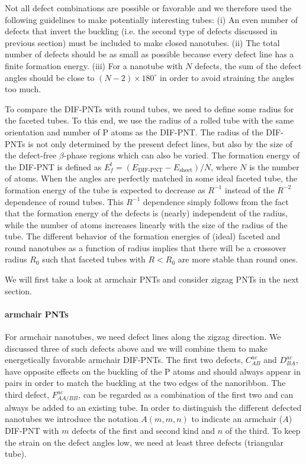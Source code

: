 Not all defect combinations are possible or favorable and we therefore used the following guidelines to make potentially interesting tubes: 
(i) An even number of defects that invert the buckling (i.e. the second type of defects discussed in previous section) must be included to make closed nanotubes. (ii) The total number of defects should  be as small as possible because every defect line has a finite formation energy. (iii) For a nanotube with $N$ defects, the sum of the defect angles should be close to $(N-2)\times 180^{\circ}$ in order to avoid straining the angles too much. 

To compare the DIF-PNTs with round tubes, we need to define some radius for the faceted tubes. To this end, we use the radius of a rolled tube with the same orientation and number of P atoms as the DIF-PNT. The radius of the DIF-PNTs is not only determined by the present defect lines, but also by the size of the defect-free $\beta$-phase regions which can also be varied. The formation energy of the DIF-PNT is defined as  $E_f^t=(E_{\text{DIF-PNT}}-E_{\text{sheet}})/N$, where $N$ is the number of atoms. When the angles are perfectly matched in some ideal faceted tube, the formation energy of the tube is expected to decrease as $R^{-1}$ instead of the $R^{-2}$ dependence of round tubes. This $R^{-1}$ dependence simply follows from the fact that the formation energy of the defects is (nearly) independent of the radius, while the number of atoms increases linearly with the size of the radius of the tube. The different behavior of the formation energies of (ideal) faceted and round nanotubes as a function of radius implies that there will be a crossover radius $R_0$ such that faceted tubes with $R<R_0$ are more stable than round ones.

We will first take a look at armchair PNTs and consider zigzag PNTs in the next section.





\paragraph*{armchair PNTs}
For armchair nanotubes, we need defect lines along the zigzag direction. We discussed three of such defects above and we will combine them to make energetically favorable armchair DIF-PNTs. The first two defects, $C_{AB}^{ac}$ and $D_{BA}^{ac}$, have opposite effects on the buckling of the P atoms and should always appear in pairs in order to match the buckling at the two edges of the nanoribbon. The third defect, $F_{AA/BB}^{ac}$, can be regarded as a combination of the first two and can always be added to an existing tube. In order to distinguish the different defected nanotubes we introduce the notation $A(m,m,n)$ to indicate an armchair ($A$) DIF-PNT with $m$ defects of the first and second kind and $n$ of the third. To keep the strain on the defect angles low, we need at least three defects (triangular tube). 

